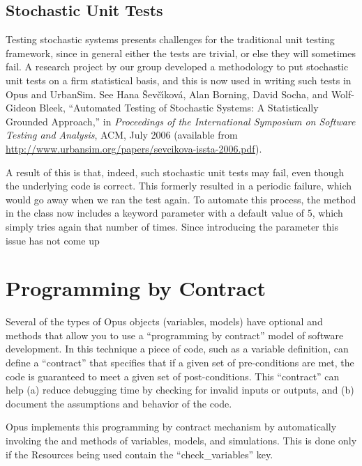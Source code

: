 \subsection{Stochastic Unit Tests}

 
Testing stochastic systems presents challenges for the traditional unit
testing framework, since in general either the tests are trivial, or else
they will sometimes fail.  A research project by our group developed a
methodology to put stochastic unit tests on a firm statistical basis, and
this is now used in writing such tests in Opus and UrbanSim.  See
Hana {\v{S}}ev\v{c}\'{\i}kov\'{a}, Alan Borning, David Socha, and
Wolf-Gideon Bleek, ``Automated Testing of Stochastic Systems: A
Statistically Grounded Approach,'' in \emph{Proceedings of the
International Symposium on Software Testing and Analysis}, ACM,
July 2006 (available from
\url{http://www.urbansim.org/papers/sevcikova-issta-2006.pdf}).

A result of this is that, indeed, such stochastic unit tests may fail, even
though the underlying code is correct.  This formerly resulted in a 
periodic failure, which would go away when we ran the test again.  To automate
this process, the  method in the
 class now includes a keyword parameter 
with a default value of 5, which simply tries again that number of times.  Since
introducing the  parameter this issue has not come up

\section{Programming by Contract}
\label{sec:programming-by-contract}
%
Several of the types of Opus objects (variables, models) have
optional  and  methods that allow you to
use a ``programming by contract'' model of software development. In this
technique a piece of code, such as a variable definition, can define a
``contract'' that specifies that if a given set of pre-conditions are met, the
code is guaranteed to meet a given set of post-conditions. This ``contract''
can help (a) reduce debugging time by checking for invalid inputs or outputs,
and (b) document the assumptions and behavior of the code.

Opus implements this programming by contract mechanism by automatically
invoking the  and  methods of variables,
models, and simulations.  This is done only if the Resources being used
contain the ``check_variables'' key.

